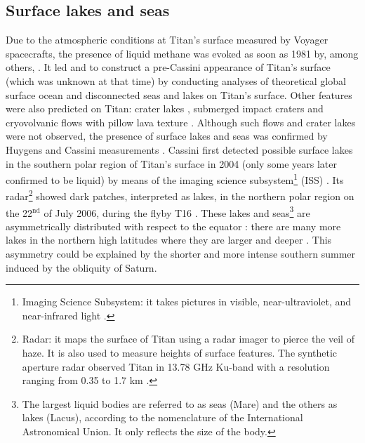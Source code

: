 \subsection{Surface lakes and seas }
\label{sec:intro:liquidBodies}
Due to the atmospheric conditions at Titan's surface measured by Voyager spacecrafts, the presence of liquid methane was evoked as soon as 1981 by, among others, \citet{samuelson1981mean,hanel1981infrared}. It led \citet{sagan1982tide} and \citet{dermott1995tidal} to construct a pre-Cassini appearance of Titan's surface (which was unknown at that time) by conducting analyses of theoretical global surface ocean and disconnected seas and lakes on Titan's surface. Other features were also predicted on Titan: crater lakes \citep{lorenz1994crater}, submerged impact craters \citep{lorenz1997impacts} and cryovolvanic flows with pillow lava texture \citep{lorenz1996pillow}. Although such flows and crater lakes were not observed, the presence of surface lakes and seas was confirmed by Huygens and Cassini measurements \citep{mcewen2005mapping,stofan2007lakes}. Cassini first detected possible surface lakes in the southern polar region of Titan's surface in 2004 (only some years later confirmed to be liquid) by means of the imaging science subsystem\footnote{Imaging Science Subsystem: it takes pictures in visible, near-ultraviolet, and near-infrared light \citep[see][]{porco2004cassini}.} (ISS) \citep{mcewen2005mapping}. Its radar\footnote{Radar: it maps the surface of Titan using a radar imager to pierce the veil of haze. It is also used to measure heights of surface features. The synthetic aperture radar observed Titan in 13.78 GHz Ku-band with a resolution ranging from 0.35 to 1.7 km \citep[see][]{elachi2004radar}.} showed dark patches, interpreted as lakes, in the northern polar region on the 22$^{\text{nd}}$ of July 2006, during the flyby T16 \citep{stofan2007lakes}. These lakes and seas\footnote{The largest liquid bodies are referred to as seas (Mare) and the others as lakes (Lacus), according to the nomenclature of the International Astronomical Union. It only reflects the size of the body.} are asymmetrically distributed with respect to the equator \citep{aharonson2009asymmetric}: there are many more lakes in the northern high latitudes where they are larger and deeper \citep{hayes2008hydrocarbon, hayes2018post}. This asymmetry could be explained by the shorter and more intense southern summer induced by the obliquity of Saturn.

